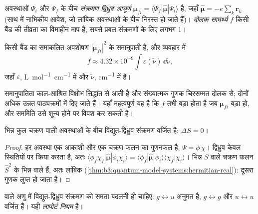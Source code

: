 \begin{definition}[संक्रमण द्विध्रुव आघूर्ण, दोलक सामर्थ्य]\label{def:b3:electronic-spectroscopy:transition-dipole}
अवस्थाओं $\Psi_i$ और $\Psi_f$ के बीच \emph{संक्रमण द्विध्रुव आघूर्ण}
$\boldsymbol\mu_{fi} = \langle\Psi_f|\hat{\boldsymbol\mu}|\Psi_i
\rangle$ है, जहाँ $\hat{\boldsymbol\mu} = -e\sum_k\mathbf r_k$ (साथ में नाभिकीय
आवेश, जो लांबिक अवस्थाओं के बीच निरस्त हो जाते हैं)। \emph{दोलक
सामर्थ्य} $f$ किसी बैंड की तीव्रता का विमाहीन माप है,
सबसे प्रबल संक्रमणों के लिए लगभग 1।
\end{definition}

\begin{proposition}[तीव्रता और दोलक सामर्थ्य]\label{prop:b3:electronic-spectroscopy:intensity}
किसी बैंड का समाकलित अवशोषण $|\boldsymbol\mu_{fi}|^2$ के समानुपाती है,
और व्यवहार में
\[
f \approx 4.32\times10^{-9}\int\varepsilon(\tilde\nu)\,\dd\tilde\nu,
\]
जहाँ $\varepsilon$, \unit{L.mol^{-1}.cm^{-1}} में और $\tilde\nu$, \unit{cm^{-1}} में है।
\end{proposition}
\admitted

समानुपातिता काल-आश्रित विक्षोभ सिद्धांत से आती है और
संख्यात्मक गुणक चिरसम्मत दोलक से; दोनों अधिक उन्नत पाठ्यक्रमों में दिए जाते हैं।
यहाँ महत्वपूर्ण यह है कि $f$ तभी बड़ा होता है जब
$\boldsymbol\mu_{fi}$ बड़ा हो, और सममिति उसे शून्य होने पर विवश कर सकती है।

\begin{theorem}[चक्रण वरण नियम]\label{thm:b3:electronic-spectroscopy:spin-rule}
भिन्न कुल चक्रण वाली अवस्थाओं के बीच विद्युत-द्विध्रुव संक्रमण
वर्जित है: $\Delta S = 0$।
\end{theorem}

\begin{proof}
हर अवस्था एक आकाशी और एक चक्रण फलन का गुणनफल है, $\Psi = \phi\,\chi$।
द्विध्रुव  केवल स्थितियों पर क्रिया करता है, अतः $\langle\phi_f\chi_f|\hat{\boldsymbol\mu}|
\phi_i\chi_i\rangle = \langle\phi_f|\hat{\boldsymbol\mu}|\phi_i\rangle\langle\chi_f|\chi_i\rangle$।
भिन्न $S$ वाले चक्रण फलन $\hat S^2$ के भिन्न  वाले  हैं,
अतः लांबिक (\cref{thm:b3:quantum-model-systems:hermitian-real}):
दूसरा गुणक लुप्त हो जाता है।
\end{proof}

\begin{theorem}[लापोर्ट नियम]\label{thm:b3:electronic-spectroscopy:laporte}
 वाले अणु में विद्युत-द्विध्रुव संक्रमण को
समता बदलनी ही चाहिए: $g \leftrightarrow u$ अनुमत है, $g \leftrightarrow g$ और $u
\leftrightarrow u$ वर्जित हैं। यही \emph{लापोर्ट नियम} है।
\end{theorem}

